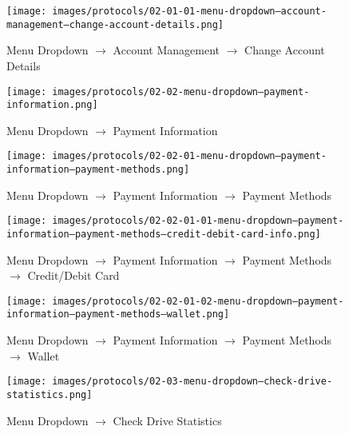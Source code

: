 \documentclass[a4paper, 12pt]{article}
\begin{document}
\begin{figure} [htbp]
  \begin{center}
    \texttt{[image: images/protocols/02-01-01-menu-dropdown--account-management--change-account-details.png]}
  \end{center}
  \caption{Menu Dropdown $\rightarrow$ Account Management $\rightarrow$ Change Account Details}
\end{figure}

\begin{figure} [htbp]
  \begin{center}
    \texttt{[image: images/protocols/02-02-menu-dropdown--payment-information.png]}
  \end{center}
  \caption{Menu Dropdown $\rightarrow$ Payment Information}
\end{figure}

\begin{figure} [htbp]
  \begin{center}
    \texttt{[image: images/protocols/02-02-01-menu-dropdown--payment-information--payment-methods.png]}
  \end{center}
  \caption{Menu Dropdown $\rightarrow$ Payment Information $\rightarrow$ Payment Methods}
\end{figure}

\begin{figure} [htbp]
  \begin{center}
    \texttt{[image: images/protocols/02-02-01-01-menu-dropdown--payment-information--payment-methods--credit-debit-card-info.png]}
  \end{center}
  \caption{Menu Dropdown $\rightarrow$ Payment Information $\rightarrow$ Payment Methods $\rightarrow$ Credit/Debit Card}
\end{figure}

\begin{figure} [htbp]
  \begin{center}
    \texttt{[image: images/protocols/02-02-01-02-menu-dropdown--payment-information--payment-methods--wallet.png]}
  \end{center}
  \caption{Menu Dropdown $\rightarrow$ Payment Information $\rightarrow$ Payment Methods $\rightarrow$ Wallet}
\end{figure}

\begin{figure} [htbp]
  \begin{center}
    \texttt{[image: images/protocols/02-03-menu-dropdown--check-drive-statistics.png]}
  \end{center}
  \caption{Menu Dropdown $\rightarrow$ Check Drive Statistics}
\end{figure}
\end{document}
